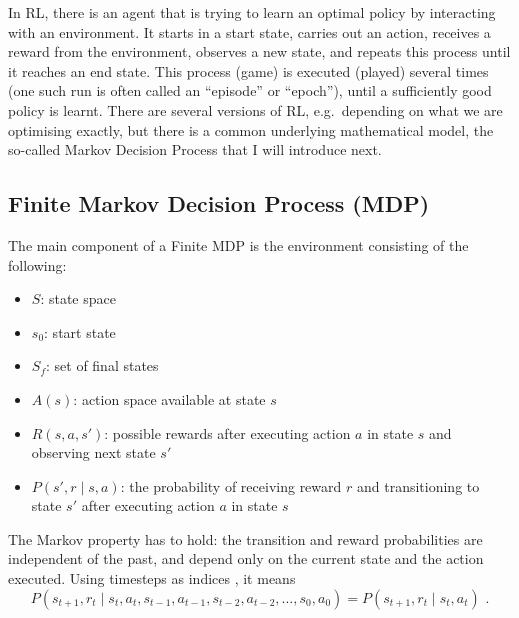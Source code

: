In RL, there is an agent that is trying to learn an optimal policy by interacting with an environment. It starts in a start state, carries out an action, receives a reward from the environment, observes a new state, and repeats this process until it reaches an end state. This process (game) is executed (played) several times (one such run is often called an ``episode'' or ``epoch''), until a sufficiently good policy is learnt. There are several versions of RL, e.g.\ depending on what we are optimising exactly, but there is a common underlying mathematical model, the so-called Markov Decision Process that I will introduce next.

\subsection{Finite Markov Decision Process (MDP)}


The main component of a Finite MDP is the environment consisting of the following:
\begin{itemize}[itemsep=0pt]
    \item $S$: state space
    \item $s_0$: start state
    \item $S_f$: set of final states
    \item $A(s)$: action space available at state $s$
    \item $R(s, a, s')$: possible rewards after executing action $a$ in state $s$ and observing next state $s'$
    \item $P(s', r \mid s, a)$: the probability of receiving reward $r$ and transitioning to state $s'$ after executing action $a$ in state $s$
\end{itemize} 


The Markov property has to hold: the transition and reward probabilities are independent of the past, and depend only on the current state and the action executed. Using timesteps as indices , it means
\begin{equation} \label{eq:MarkovProperty}
P(s_{t+1},r_{t} \mid s_{t}, a_{t}, s_{t-1}, a_{t-1}, s_{t-2}, a_{t-2}, ..., s_{0}, a_{0}) = P(s_{t+1},r_{t} \mid s_{t}, a_{t})\text{ .}
\end{equation}



